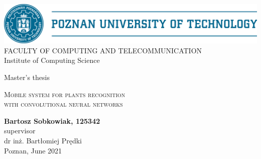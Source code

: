 
\begin{titlepage}
	
	
	\thispagestyle{frontpage}
	
	\begin{center}
		


        \includegraphics[width=\textwidth]{Images/wit/sygnet-pp-eng.eps} \\
        FACULTY OF COMPUTING AND TELECOMMUNICATION\\
        Institute of Computing Science \\

        
        \vspace*{3,5\baselineskip}
        
	    \large {Master's thesis}\\
		\vspace*{1,5\baselineskip}
		
		\huge{\textsc{Mobile system for plants recognition\\ with convolutional neural networks}}\\
		
        \vspace*{1,5\baselineskip}

		\large{\textbf{Bartosz Sobkowiak, 125342}}\\
		\vspace{2,5\baselineskip}
		\large{supervisor}\\
		\large{{dr inż. Bartłomiej Prędki }}\\
		
		\vspace*{\fill}
		\large{{Poznan, June 2021}}\\

	\end{center}
	
	\vspace*{4\baselineskip}

\bibitem{}
\biblio
	
\end{titlepage}
